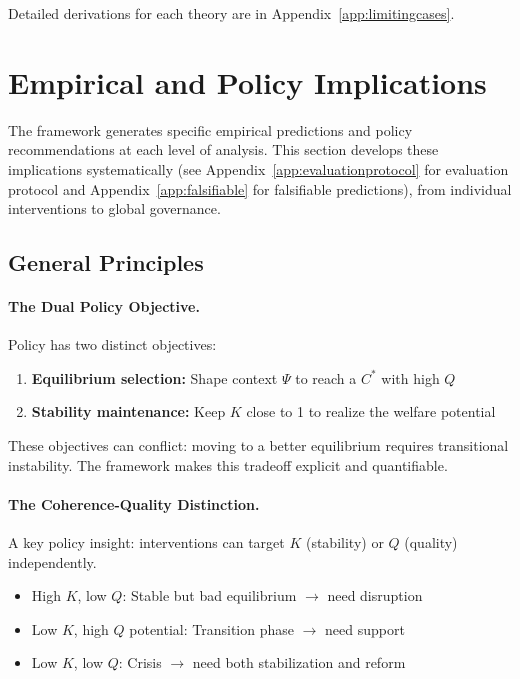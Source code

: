 \documentclass[12pt,a4paper]{article}
\begin{document}
Detailed derivations for each theory are in Appendix~\ref{app:limitingcases}.

\section{Empirical and Policy Implications}
\label{sec:empiricalpolicy}

The framework generates specific empirical predictions and policy recommendations
at each level of analysis. This section develops these implications systematically (see Appendix~\ref{app:evaluationprotocol} for evaluation protocol and Appendix~\ref{app:falsifiable} for falsifiable predictions),
from individual interventions to global governance.

\subsection{General Principles}

\paragraph{The Dual Policy Objective.}
Policy has two distinct objectives:
\begin{enumerate}
  \item \textbf{Equilibrium selection:} Shape context $\Psi$ to reach a $C^*$ with high $Q$
  \item \textbf{Stability maintenance:} Keep $K$ close to 1 to realize the welfare potential
\end{enumerate}

These objectives can conflict: moving to a better equilibrium requires transitional instability.
The framework makes this tradeoff explicit and quantifiable.

\paragraph{The Coherence-Quality Distinction.}
A key policy insight: interventions can target $K$ (stability) or $Q$ (quality) independently.
\begin{itemize}
  \item High $K$, low $Q$: Stable but bad equilibrium $\rightarrow$ need disruption
  \item Low $K$, high $Q$ potential: Transition phase $\rightarrow$ need support
  \item Low $K$, low $Q$: Crisis $\rightarrow$ need both stabilization and reform
\end{itemize}
\end{document}
